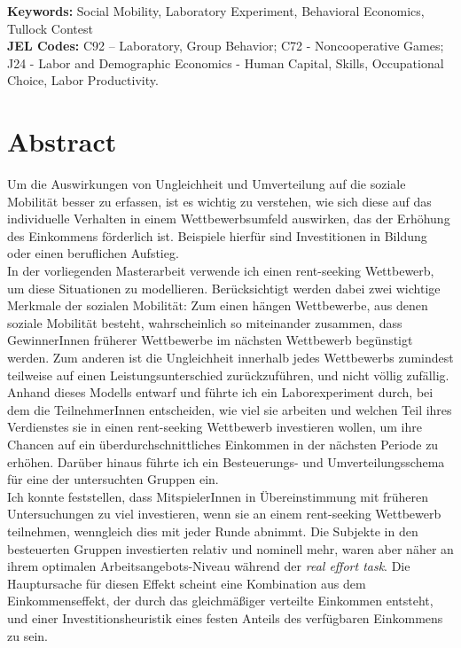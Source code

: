 \begin{footnotesize}

\textbf{Keywords:} Social Mobility, Laboratory Experiment, Behavioral Economics, Tullock Contest\\

\textbf{JEL Codes:} 
C92 – Laboratory, Group Behavior; C72 - Noncooperative Games;
J24 - Labor and Demographic Economics - Human Capital, Skills, Occupational Choice, Labor Productivity.

\end{footnotesize}

\chapter*{Abstract}

\begin{small}
Um die Auswirkungen von Ungleichheit und Umverteilung auf die soziale Mobilität besser zu erfassen, ist es wichtig zu verstehen, wie sich diese auf das individuelle Verhalten in einem Wettbewerbsumfeld auswirken, das der Erhöhung des Einkommens förderlich ist. Beispiele hierfür sind Investitionen in Bildung oder einen beruflichen Aufstieg.\\

In der vorliegenden Masterarbeit verwende ich einen rent-seeking Wettbewerb, um diese Situationen zu modellieren. Berücksichtigt werden dabei zwei wichtige Merkmale der sozialen Mobilität: Zum einen hängen Wettbewerbe, aus denen soziale Mobilität besteht, wahrscheinlich so miteinander zusammen, dass GewinnerInnen früherer Wettbewerbe im nächsten Wettbewerb begünstigt werden. Zum anderen ist die Ungleichheit innerhalb jedes Wettbewerbs zumindest teilweise auf einen Leistungsunterschied zurückzuführen, und nicht völlig zufällig.\\

Anhand dieses Modells entwarf und führte ich ein Laborexperiment durch, bei dem die TeilnehmerInnen entscheiden, wie viel sie arbeiten und welchen Teil ihres Verdienstes sie in einen rent-seeking Wettbewerb investieren wollen, um ihre Chancen auf ein überdurchschnittliches Einkommen in der nächsten Periode zu erhöhen. Darüber hinaus führte ich ein Besteuerungs- und Umverteilungsschema für eine der untersuchten Gruppen ein.\\

Ich konnte feststellen, dass MitspielerInnen in Übereinstimmung mit früheren Untersuchungen zu viel investieren, wenn sie an einem rent-seeking Wettbewerb teilnehmen, wenngleich dies mit jeder Runde abnimmt. Die Subjekte in den besteuerten Gruppen investierten relativ und nominell mehr, waren aber näher an ihrem optimalen Arbeitsangebots-Niveau während der \textit{real effort task}. Die Hauptursache für diesen Effekt scheint eine Kombination aus dem Einkommenseffekt, der durch das gleichmäßiger verteilte Einkommen entsteht, und einer Investitionsheuristik eines festen Anteils des verfügbaren Einkommens zu sein.\\


\end{small}
